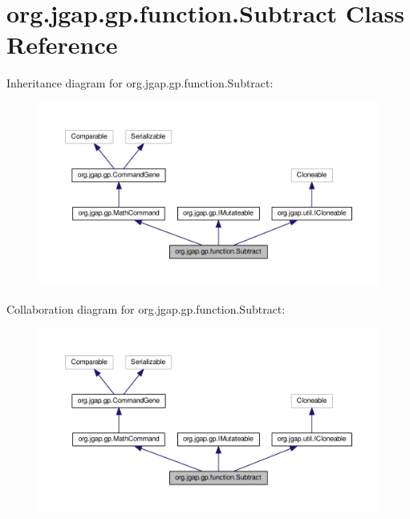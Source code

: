 \hypertarget{classorg_1_1jgap_1_1gp_1_1function_1_1_subtract}{\section{org.\-jgap.\-gp.\-function.\-Subtract Class Reference}
\label{classorg_1_1jgap_1_1gp_1_1function_1_1_subtract}
}


Inheritance diagram for org.\-jgap.\-gp.\-function.\-Subtract\-:
\nopagebreak
\begin{figure}[H]
\begin{center}
\leavevmode
\includegraphics[width=350pt]{classorg_1_1jgap_1_1gp_1_1function_1_1_subtract__inherit__graph}
\end{center}
\end{figure}


Collaboration diagram for org.\-jgap.\-gp.\-function.\-Subtract\-:
\nopagebreak
\begin{figure}[H]
\begin{center}
\leavevmode
\includegraphics[width=350pt]{classorg_1_1jgap_1_1gp_1_1function_1_1_subtract__coll__graph}
\end{center}
\end{figure}
